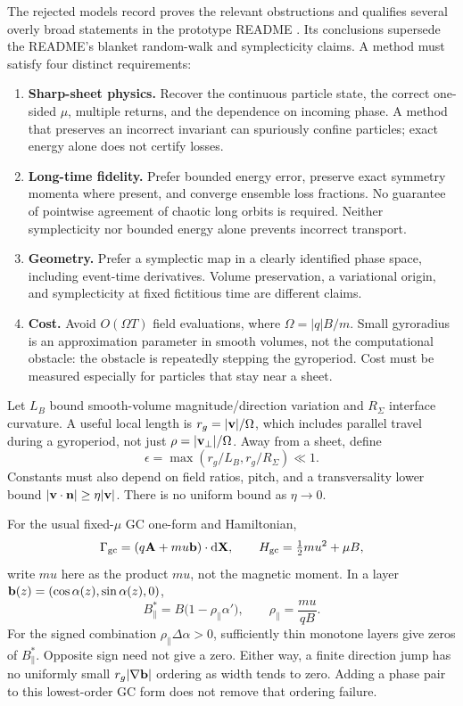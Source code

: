 \documentclass[10pt,a4paper]{article}
\newcommand{\X}{\mathbf X}\newcommand{\n}{\mathbf n}
\newcommand{\A}{\mathbf A}\newcommand{\dd}{\mathrm d}
\begin{document}
The rejected models record \cite{rejected} proves the relevant obstructions and qualifies several overly broad statements in the prototype README \cite{sheetreadme}. Its conclusions supersede the README's blanket random-walk and symplecticity claims. A method must satisfy four distinct requirements:
\begin{enumerate}
\item \textbf{Sharp-sheet physics.} Recover the continuous particle state, the correct one-sided $\mu$, multiple returns, and the dependence on incoming phase. A method that preserves an incorrect invariant can spuriously confine particles; exact energy alone does not certify losses.
\item \textbf{Long-time fidelity.} Prefer bounded energy error, preserve exact symmetry momenta where present, and converge ensemble loss fractions. No guarantee of pointwise agreement of chaotic long orbits is required. Neither symplecticity nor bounded energy alone prevents incorrect transport.
\item \textbf{Geometry.} Prefer a symplectic map in a clearly identified phase space, including event-time derivatives. Volume preservation, a variational origin, and symplecticity at fixed fictitious time are different claims.
\item \textbf{Cost.} Avoid $O(\Omega T)$ field evaluations, where $\Omega=|q|B/m$. Small gyroradius is an approximation parameter in smooth volumes, not the computational obstacle: the obstacle is repeatedly stepping the gyroperiod. Cost must be measured especially for particles that stay near a sheet.
\end{enumerate}
Let $L_B$ bound smooth-volume magnitude/direction variation and $R_\Sigma$ interface curvature. A useful local length is $r_g=|\mathbf v|/\Omega$, which includes parallel travel during a gyroperiod, not just $\rho=|\mathbf v_\perp|/\Omega$. Away from a sheet, define
\begin{equation}
 \epsilon=\max(r_g/L_B,r_g/R_\Sigma)\ll1.
\end{equation}
Constants must also depend on field ratios, pitch, and a transversality lower bound $|\v\cdot\n|\ge\eta|\v|$. There is no uniform bound as $\eta\to0$.

For the usual fixed-$\mu$ GC one-form and Hamiltonian,
\begin{equation}\label{eq:gc}
 \Gamma_{\rm gc}=(q\A+m u\bunit)\cdot\dd\X,
 \qquad H_{\rm gc}=\tfrac12mu^2+\mu B,
\end{equation}
write $mu$ here as the product $m u$, not the magnetic moment. In a layer $\mathbf b(z)=(\cos\alpha(z),\sin\alpha(z),0)$,
\begin{equation}
 B_\parallel^*=B\bigl(1-\rho_\parallel\alpha'\bigr),
 \qquad\rho_\parallel=\frac{m u}{qB}.
\end{equation}
For the signed combination $\rho_\parallel\Delta\alpha>0$, sufficiently thin monotone layers give zeros of $B_\parallel^*$. Opposite sign need not give a zero. Either way, a finite direction jump has no uniformly small $r_g|\nabla\mathbf b|$ ordering as width tends to zero. Adding a phase pair to this lowest-order GC form does not remove that ordering failure.
\end{document}
